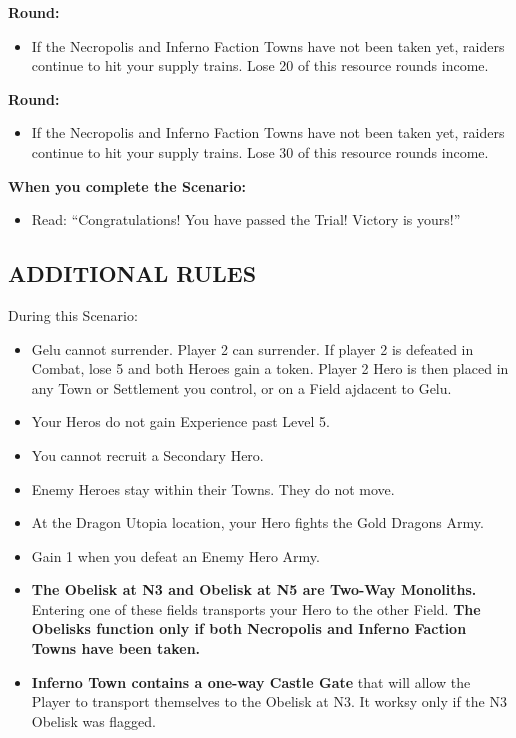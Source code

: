 \begin{multicols*}{2}
\textbf{ Round:}
\begin{itemize}
  \item If the Necropolis and Inferno Faction Towns have not been taken yet, raiders continue to hit your supply trains.
    Lose 20  of this resource rounds income.
\end{itemize}

\textbf{ Round:}
\begin{itemize}
  \item If the Necropolis and Inferno Faction Towns have not been taken yet, raiders continue to hit your supply trains.
    Lose 30  of this resource rounds income.
\end{itemize}

\textbf{When you complete the Scenario:}
\begin{itemize}
  \item Read: ``Congratulations! You have passed the Trial! Victory is yours!''
\end{itemize}


\subsection*{\MakeUppercase{Additional Rules}}

During this Scenario:

\begin{itemize}
    \item Gelu cannot surrender.
      Player 2 can surrender.
      If player 2 is defeated in Combat, lose 5  and both Heroes gain a  token.
      Player 2 Hero is then placed in any Town or Settlement you control, or on a Field ajdacent to Gelu.
    \item Your Heros do not gain Experience past Level 5.
    \item You cannot recruit a Secondary Hero.
    \item Enemy Heroes stay within their Towns. They do not move.
    \item At the Dragon Utopia location, your Hero fights the Gold Dragons Army.
    \item Gain 1  when you defeat an Enemy Hero Army.
    \item \textbf{The Obelisk at N3 and Obelisk at N5 are Two-Way Monoliths.}
      Entering one of these fields transports your Hero to the other Field. \textbf{The Obelisks function only if both Necropolis and Inferno Faction Towns have been taken.}
    \item \textbf{Inferno Town contains a one-way Castle Gate} that will allow the Player to transport themselves to the Obelisk at N3. It worksy only if the N3 Obelisk was flagged.
\end{itemize}


\end{multicols*}
